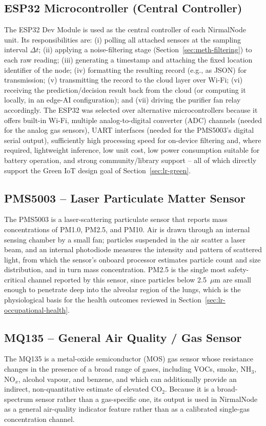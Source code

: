 \subsection{ESP32 Microcontroller (Central Controller)}
\label{sec:meth-esp32}

The ESP32 Dev Module is used as the central controller of each NirmalNode unit. Its responsibilities are: (i) polling all attached sensors at the sampling interval $\Delta t$; (ii) applying a noise-filtering stage (Section~\ref{sec:meth-filtering}) to each raw reading; (iii) generating a timestamp and attaching the fixed location identifier of the node; (iv) formatting the resulting record (e.g., as JSON) for transmission; (v) transmitting the record to the cloud layer over Wi-Fi; (vi) receiving the prediction/decision result back from the cloud (or computing it locally, in an edge-AI configuration); and (vii) driving the purifier fan relay accordingly. The ESP32 was selected over alternative microcontrollers because it offers built-in Wi-Fi, multiple analog-to-digital converter (ADC) channels (needed for the analog gas sensors), UART interfaces (needed for the PMS5003's digital serial output), sufficiently high processing speed for on-device filtering and, where required, lightweight inference, low unit cost, low power consumption suitable for battery operation, and strong community/library support -- all of which directly support the Green IoT design goal of Section~\ref{sec:lr-green}.

\subsection{PMS5003 -- Laser Particulate Matter Sensor}
The PMS5003 is a laser-scattering particulate sensor that reports mass concentrations of PM1.0, PM2.5, and PM10. Air is drawn through an internal sensing chamber by a small fan; particles suspended in the air scatter a laser beam, and an internal photodiode measures the intensity and pattern of scattered light, from which the sensor's onboard processor estimates particle count and size distribution, and in turn mass concentration. PM2.5 is the single most safety-critical channel reported by this sensor, since particles below 2.5~$\mu$m are small enough to penetrate deep into the alveolar region of the lungs, which is the physiological basis for the health outcomes reviewed in Section~\ref{sec:lr-occupational-health}.

\subsection{MQ135 -- General Air Quality / Gas Sensor}
The MQ135 is a metal-oxide semiconductor (MOS) gas sensor whose resistance changes in the presence of a broad range of gases, including VOCs, smoke, NH$_3$, NO$_x$, alcohol vapour, and benzene, and which can additionally provide an indirect, non-quantitative estimate of elevated CO$_2$. Because it is a broad-spectrum sensor rather than a gas-specific one, its output is used in NirmalNode as a general air-quality indicator feature rather than as a calibrated single-gas concentration channel.

